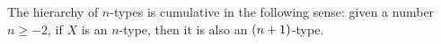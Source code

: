 \documentclass[hott-all.tex]{subfiles}
\begin{document}
% 
\begin{thm}
 The hierarchy of $n$-types is cumulative in the following sense:
   given a number $n \geq -2$, if $X$ is an $n$-type, then it is also an $(n+1)$-type.
\end{thm}
% 
% 
% 
% 
\end{document}

